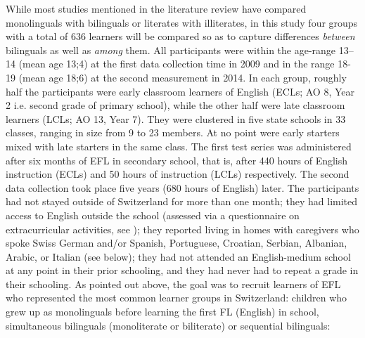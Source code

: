 \documentclass[output=paper,modfonts,nonflat,newtxmath]{langsci/langscibook}
\begin{document}
While most studies mentioned in the literature review have compared monolinguals with bilinguals or literates with illiterates, in this study four groups with a total of 636 learners will be compared so as to capture differences \textit{between} bilinguals as well as \textit{among} them. All participants were within the age-range 13--14 (mean age 13;4) at the first data collection time in 2009 and in the range 18-19 (mean age 18;6) at the second measurement in 2014. In each group, roughly half the participants were early classroom learners of English (ECLs; AO 8, Year 2 i.e. second grade of primary school), while the other half were late classroom learners (LCLs; AO 13, Year 7). They were clustered in five state schools in 33 classes, ranging in size from 9 to 23 members. At no point were early starters mixed with late starters in the same class. The first test series was administered after six months of EFL in secondary school, that is, after 440 hours of English instruction (ECLs) and 50 hours of instruction (LCLs) respectively. The second data collection took place five years (680 hours of English) later. The participants had not stayed outside of Switzerland for more than one month; they had limited access to English outside the school (assessed via a questionnaire on extracurricular activities, see \citealt{PfenningerSingleton2017}); they reported living in homes with caregivers who spoke Swiss German and/or Spanish, Portuguese, Croatian, Serbian, Albanian, Arabic, or Italian (see below); they had not attended an English-medium school at any point in their prior schooling,  and they had never had to repeat a grade in their schooling. As pointed out above, the goal was to recruit learners of EFL who represented the most common learner groups in Switzerland: children who grew up as monolinguals before learning the first FL (English) in school, simultaneous bilinguals (monoliterate or biliterate) or sequential bilinguals:
\end{document}
